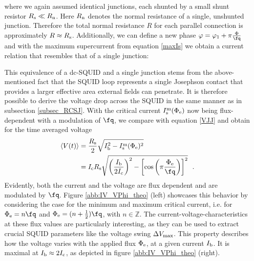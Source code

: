 
where we again assumed identical junctions, each shunted by a small shunt resistor $R_{\rm s}\ll R_{\rm n}$. Here $R_{\rm n}$ denotes the normal resistance of a single, unshunted junction. Therefore the total normal resistance $R$ for each parallel connection is approximately $R\approx R_{\rm s}$. Additionally, we can define a new phase $\varphi=\varphi_1 + \pi\frac{\Phi}{\unit{\fq}}$ and with the maximum supercurrent from equation \ref{maxIs} we obtain a current relation that resembles that of a single junction:


This equivalence of a dc-SQUID and a single junction stems from the above-mentioned fact that the SQUID loop represents a single Josephson contact that provides a larger effective area external fields can penetrate. It is therefore possible to derive the voltage drop across the SQUID in the same manner as in subsection \ref{subsec_RCSJ}. With the critical current $I_{\rm s}^{\rm m}(\Phi_{\rm e})$ now being flux-dependent with a modulation of $\unit{\fq}$, we compare with equation \ref{VJJ} and obtain for the time averaged voltage \cite{Clarke2004}
\begin{align}\label{squidV(t)}
	\langle V(t)\rangle &= \frac{R_{\rm s}}{2}\sqrt{I_{\rm b}^2 - I_{\rm s}^{\rm m}(\Phi_{\rm e})^2} \\ &= I_{\rm c}R_{\rm s}\sqrt{\left(\frac{I_{\rm b}}{2I_{\rm c}}\right)^2-\left[\cos\left(\pi\frac{\Phi_{\rm e}}{\unit{\fq}}\right)\right]^2} \ \ .	
\end{align}     
Evidently, both the current and the voltage are flux dependent and are modulated by $\unit{\fq}$. Figure \ref{abb:IV_VPhi_theo} (left) showcases this behavior by considering the case for the minimum and maximum critical current, i.e. for $\Phi_{\rm e} = n\unit{\fq}$ and $\Phi_{\rm e} = (n+\frac{1}{2})\unit{\fq}$, with $n\in\mathbb{Z}$. The current-voltage-characteristics at these flux values are particularly interesting, as they can be used to extract crucial SQUID parameters like the voltage swing $\Delta V_{\rm max}$. This property describes how the voltage varies with the applied flux $\Phi_{\rm e}$, at a given current $I_{\rm b}$. It is maximal at $I_{\rm b}\approx 2I_{\rm c}$, as depicted in figure \ref{abb:IV_VPhi_theo} (right). \\

